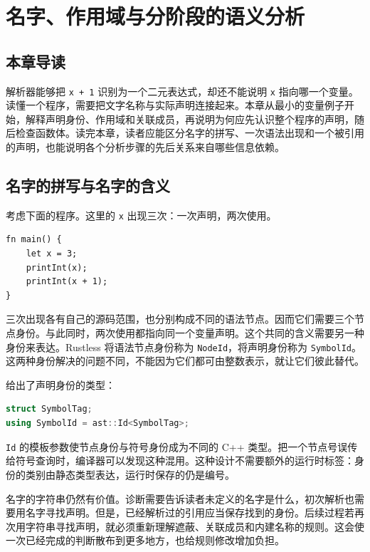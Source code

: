 \chapter{名字、作用域与分阶段的语义分析}
\label{chap:semantic-names}

\section*{本章导读}
解析器能够把 \lstinline[language=Rustless]|x + 1| 识别为一个二元表达式，却还不能说明 \lstinline[language=Rustless]|x| 指向哪一个变量。读懂一个程序，需要把文字名称与实际声明连接起来。本章从最小的变量例子开始，解释声明身份、作用域和关联成员，再说明为何应先认识整个程序的声明，随后检查函数体。读完本章，读者应能区分名字的拼写、一次语法出现和一个被引用的声明，也能说明各个分析步骤的先后关系来自哪些信息依赖。

\section{名字的拼写与名字的含义}
考虑下面的程序。这里的 \lstinline[language=Rustless]|x| 出现三次：一次声明，两次使用。
\begin{lstlisting}[language=Rustless]
fn main() {
    let x = 3;
    printInt(x);
    printInt(x + 1);
}
\end{lstlisting}
三次出现各有自己的源码范围，也分别构成不同的语法节点。因而它们需要三个节点身份。与此同时，两次使用都指向同一个变量声明。这个共同的含义需要另一种身份来表达。Rustless 将语法节点身份称为 \texttt{NodeId}，将声明身份称为 \texttt{SymbolId}。这两种身份解决的问题不同，不能因为它们都可由整数表示，就让它们彼此替代。

 给出了声明身份的类型：
\begin{lstlisting}[language=C++]
struct SymbolTag;
using SymbolId = ast::Id<SymbolTag>;
\end{lstlisting}
\texttt{Id} 的模板参数使节点身份与符号身份成为不同的 C++ 类型。把一个节点号误传给符号查询时，编译器可以发现这种混用。这种设计不需要额外的运行时标签：身份的类别由静态类型表达，运行时保存的仍是编号。

名字的字符串仍然有价值。诊断需要告诉读者未定义的名字是什么，初次解析也需要用名字寻找声明。但是，已经解析过的引用应当保存找到的身份。后续过程若再次用字符串寻找声明，就必须重新理解遮蔽、关联成员和内建名称的规则。这会使一次已经完成的判断散布到更多地方，也给规则修改增加负担。

